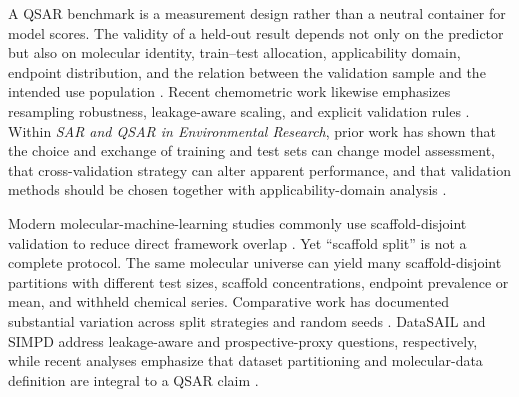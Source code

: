 A QSAR benchmark is a measurement design rather than a neutral container for model scores. The validity of a held-out result depends not only on the predictor but also on molecular identity, train--test allocation, applicability domain, endpoint distribution, and the relation between the validation sample and the intended use population \citep{tropsha2003earnest,gramatica2007principles,netzeva2005domain,sahigara2012domain}. Recent chemometric work likewise emphasizes resampling robustness, leakage-aware scaling, and explicit validation rules \citep{lasfar2024robustness,kiraly2025leakage,camacho2026validation}. Within \textit{SAR and QSAR in Environmental Research}, prior work has shown that the choice and exchange of training and test sets can change model assessment, that cross-validation strategy can alter apparent performance, and that validation methods should be chosen together with applicability-domain analysis \citep{racz2015consistency,chatterjee2022crossvalidation,heberger2023validation}.

Modern molecular-machine-learning studies commonly use scaffold-disjoint validation to reduce direct framework overlap \citep{wu2018moleculenet,bemis1996properties}. Yet ``scaffold split'' is not a complete protocol. The same molecular universe can yield many scaffold-disjoint partitions with different test sizes, scaffold concentrations, endpoint prevalence or mean, and withheld chemical series. Comparative work has documented substantial variation across split strategies and random seeds \citep{yang2019learned,deng2023systematic}. DataSAIL and SIMPD address leakage-aware and prospective-proxy questions, respectively, while recent analyses emphasize that dataset partitioning and molecular-data definition are integral to a QSAR claim \citep{joeres2025datasail,landrum2023simpd,li2026partition,nael2026dataset}.

